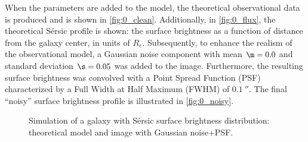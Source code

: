 When the parameters are added to the model, the theoretical observational data is produced and is shown in \cref{fig:0_clean}. Additionally, in \cref{fig:0_flux}, the theoretical Sérsic profile is shown: the surface brightness as a function of distance from the galaxy center, in units of $R_e$. Subsequently, to enhance the realism of the observational model, a Gaussian noise component with mean $\m = 0.0$ and standard deviation $\s = 0.05$ was added to the image. Furthermore, the resulting surface brightness was convolved with a Point Spread Function (PSF) characterized by a Full Width at Half Maximum (FWHM) of $\SI{0.1}{\arcsecond}$. The final ``noisy'' surface brightness profile is illustrated in \cref{fig:0_noisy}.

\begin{figure}
  \begin{minipage}{\linewidth}
    \centering
  \end{minipage}
  \begin{minipage}{\linewidth}
    \centering
  \end{minipage}
  \caption[Simulated Sérsic surface brightness: theoretical + noisy]{Simulation of a galaxy with Sérsic surface brightness distribution: \protect{} theoretical model and \protect{} image with Gaussian noise+PSF.}
  \label{fig:obs}
\end{figure}

